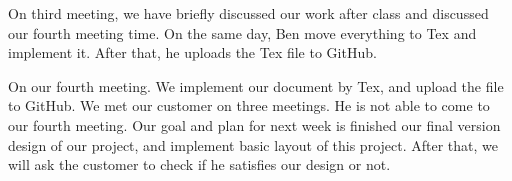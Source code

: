 \documentclass[12pt]{article}
\begin{document}
\par
On third meeting, we have briefly discussed our work after class and discussed our fourth meeting time. On the same day, Ben move everything to Tex and implement it. After that, he uploads the Tex file to GitHub. \\

\par
On our fourth meeting. We implement our document by Tex, and upload the file to GitHub. We met our customer on three meetings. He is not able to come to our fourth meeting. Our goal and plan for next week is finished our final version design of our project, and implement basic layout of this project. After that, we will ask the customer to check if he satisfies our design or not. \\

\cite{rubtut}



\end{document}

